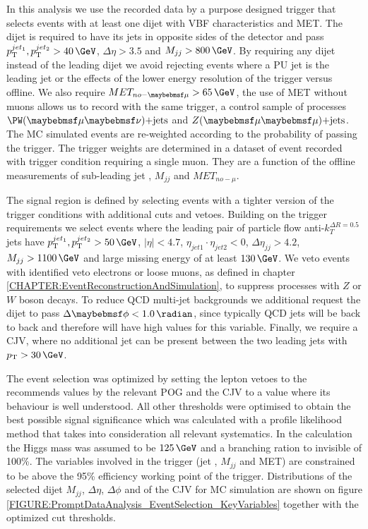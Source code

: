 

In this analysis we use the recorded data by a purpose designed trigger that selects events with at least one dijet with \gls{VBF} characteristics and \gls{MET}. The dijet is required to have its jets in opposite sides of the detector and pass $\pt^{jet_1},\pt^{jet_2} > 40\,\GeV$, $\Delta\eta > 3.5$ and $M_{jj} > 800\,\GeV$. By requiring any dijet instead of the leading dijet we avoid rejecting events where a \gls{PU} jet is the leading jet or the effects of the lower energy resolution of the trigger versus offline. We also require $MET_{no-\mu} > 65\,\GeV$, the use of \gls{MET} without muons allows us to record with the same trigger, a control sample of processes  $\PW(\mu\nu)\text{+jets}$ and $\Z(\mu\mu)\text{+jets}$. The \gls{MC} simulated events are re-weighted according to the probability of passing the trigger. The trigger weights are determined in a dataset of event recorded with trigger condition requiring a single muon. They are a function of the offline measurements of sub-leading jet \pt, $M_{jj}$ and $MET_{no-\mu}$.

The signal region is defined by selecting events with a tighter version of the trigger conditions with additional cuts and vetoes. Building on the trigger requirements we select events where the leading pair of particle flow \cite{ARTICLE:CMSParticleFlowEventRecontruction} anti-$k_T^{\Delta R=0.5}$ jets have $\pt^{jet_1},\pt^{jet_2} > 50\,\GeV$, $|\eta| < 4.7$, $\eta_{jet1} \cdot \eta_{jet2} < 0$, $\Delta\eta_{jj}>4.2$, $M_{jj}>1100\,\GeV$ and large missing energy of at least $130\,\GeV$. We veto events with identified veto electrons or loose muons, as defined in chapter \ref{CHAPTER:EventReconstructionAndSimulation}, to suppress processes with $Z$ or $W$ boson decays. To reduce \gls{QCD} multi-jet backgrounds we additional request the dijet to pass $\Delta\phi < 1.0\,\radian$, since typically \gls{QCD} jets will be back to back and therefore will have high values for this variable. Finally, we require a \acrfull{CJV}, where no additional jet can be present between the two leading jets with $\pt > 30\,\GeV$.

The event selection was optimized by setting the lepton vetoes to the recommends values by the relevant \gls{POG} and the \gls{CJV} to a value where its behaviour is well understood. All other thresholds were optimised to obtain the best possible signal significance which was calculated with a profile likelihood method that takes into consideration all relevant systematics. In the calculation the Higgs mass was assumed to be $125\,\GeV$ and a branching ration to invisible of 100\%. The variables involved in the trigger (jet \pt, $M_{jj}$ and \gls{MET}) are constrained to be above the 95\% efficiency working point of the trigger. Distributions of the selected dijet $M_{jj}$, $\Delta\eta$, $\Delta\phi$ and of the \gls{CJV} for \gls{MC} simulation are shown on figure \ref{FIGURE:PromptDataAnalysis_EventSelection_KeyVariables} together with the optimized cut thresholds.

